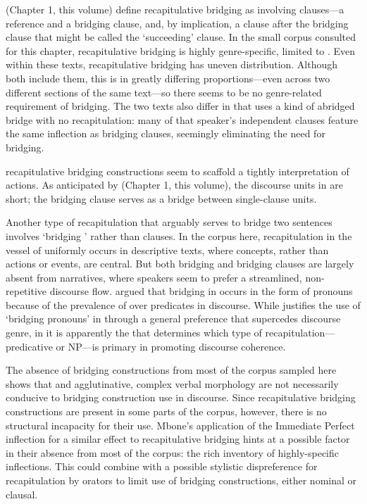 \documentclass[output=paper]{LSP/langsci}
\begin{document}
\citeauthor{guerin18} (Chapter 1, this volume) define recapitulative bridging as involving clauses—a reference and a bridging clause, and, by implication, a clause after the bridging clause that might be called the `succeeding' clause. In the small corpus consulted for this chapter,  recapitulative bridging is highly genre-specific, limited to . Even within these texts, recapitulative bridging has uneven distribution. Although both  include them, this is in greatly differing proportions—even across two different sections of the same text—so there seems to be no genre-related requirement of bridging. The two texts also differ in that \citet{Mbone2014} uses a kind of abridged bridge with no recapitulation: many of that speaker’s independent clauses feature the same inflection as bridging clauses, seemingly eliminating the need for bridging.

 recapitulative bridging constructions seem to scaffold a tightly  interpretation of actions. As anticipated by \citeauthor{guerin18} (Chapter 1, this volume), the discourse units in   are short; the bridging clause serves as a bridge between single-clause units. 

Another type of recapitulation that arguably serves to bridge two sentences involves `bridging ' rather than clauses. In the  corpus here, recapitulation in the vessel of  uniformly occurs in descriptive texts, where concepts, rather than actions or events, are central. But both bridging  and bridging clauses are largely absent from narratives, where  speakers seem to prefer a streamlined, non-repetitive discourse flow. \citet{seifart10} argued that bridging in  occurs in the form of pronouns because of the prevalence of  over predicates in  discourse. While \citet{seifart10} justifies the use of `bridging pronouns' in  through a general preference that supercedes discourse genre, in  it is apparently the  that determines which type of recapitulation—predicative or NP—is primary in promoting discourse coherence.

The absence of bridging constructions from most of the  corpus sampled here shows that  and agglutinative, complex verbal morphology are not necessarily conducive to bridging construction use in discourse. Since recapitulative bridging constructions are present in some parts of the corpus, however, there is no structural incapacity for their use. Mbone’s application of the Immediate Perfect inflection for a similar effect to recapitulative bridging hints at a possible factor in their absence from most of the corpus: the rich  inventory of highly-specific  inflections. This could combine with a possible stylistic dispreference for recapitulation by  orators to limit use of bridging constructions, either nominal or clausal.
\end{document}
